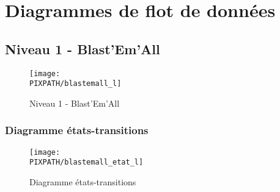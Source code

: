 \section{Diagrammes de flot de données}

\subsection{Niveau 1 - Blast'Em'All}

\begin{center}
\begin{figure}[!h]
\texttt{[image: \\PIXPATH/blastemall\_l]}
\caption{Niveau 1 - Blast'Em'All}
\end{figure}
\end{center}

\subsubsection{Diagramme états-transitions}

\begin{center}
\begin{figure}[!h]
\texttt{[image: \\PIXPATH/blastemall\_etat\_l]}
\caption{Diagramme états-transitions}
\end{figure}
\end{center}


